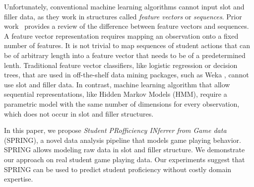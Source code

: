 \documentclass{sigchi}
\def\algname{SPRING\xspace}
\begin{document}
	
	Unfortunately, conventional machine learning algorithms cannot input slot and filler data, as they  work in  structures called \textit{feature vectors} or \textit{sequences}.
	Prior work~\cite{sequences} provides a   review of  the difference between feature vectors and sequences.
	A feature vector representation requires mapping an observation onto a fixed number of features.
	It is not trivial to map sequences of student actions that can be of arbitrary length into a feature vector that needs to be of a predetermined lenth.
	Traditional feature vector classifiers,  like logistic regression or decision trees,  that are used in off-the-shelf data mining packages, such as Weka \cite{hall2009weka}, cannot  use slot and filler data. 
	In contrast, machine learning algorithm that allow sequential representations, like Hidden Markov Models (HMM), require a parametric model with the same number of dimensions for every observation, which does not occur in slot and filler structures.


In this paper, we propose \textit{Student PRofficiency INferrer from Game data} (SPRING), a novel data analysis pipeline that models game playing behavior.
\algname allows modeling raw data in slot and filler structure.
We demonstrate our approach on real student game playing data.
Our experiments suggest that \algname can be used to predict student proficiency  without costly domain expertise.



\end{document}
